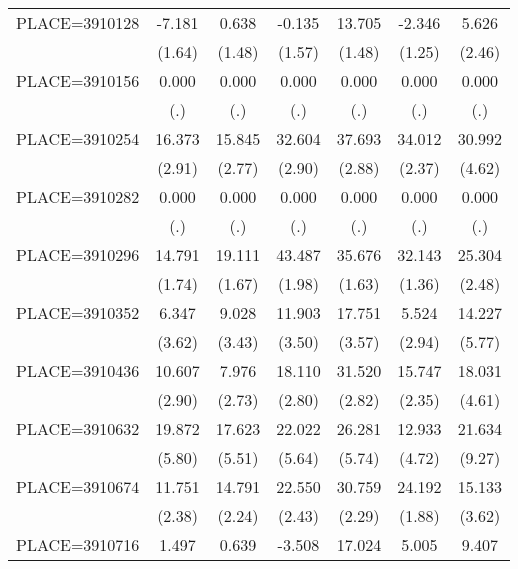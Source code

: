 {\begin{tabular}{l*{6}{c}}
PLACE=3910128       &      -7.181&       0.638&      -0.135&      13.705&      -2.346&       5.626\\
                    &      (1.64)&      (1.48)&      (1.57)&      (1.48)&      (1.25)&      (2.46)\\
PLACE=3910156       &       0.000&       0.000&       0.000&       0.000&       0.000&       0.000\\
                    &         (.)&         (.)&         (.)&         (.)&         (.)&         (.)\\
PLACE=3910254       &      16.373&      15.845&      32.604&      37.693&      34.012&      30.992\\
                    &      (2.91)&      (2.77)&      (2.90)&      (2.88)&      (2.37)&      (4.62)\\
PLACE=3910282       &       0.000&       0.000&       0.000&       0.000&       0.000&       0.000\\
                    &         (.)&         (.)&         (.)&         (.)&         (.)&         (.)\\
PLACE=3910296       &      14.791&      19.111&      43.487&      35.676&      32.143&      25.304\\
                    &      (1.74)&      (1.67)&      (1.98)&      (1.63)&      (1.36)&      (2.48)\\
PLACE=3910352       &       6.347&       9.028&      11.903&      17.751&       5.524&      14.227\\
                    &      (3.62)&      (3.43)&      (3.50)&      (3.57)&      (2.94)&      (5.77)\\
PLACE=3910436       &      10.607&       7.976&      18.110&      31.520&      15.747&      18.031\\
                    &      (2.90)&      (2.73)&      (2.80)&      (2.82)&      (2.35)&      (4.61)\\
PLACE=3910632       &      19.872&      17.623&      22.022&      26.281&      12.933&      21.634\\
                    &      (5.80)&      (5.51)&      (5.64)&      (5.74)&      (4.72)&      (9.27)\\
PLACE=3910674       &      11.751&      14.791&      22.550&      30.759&      24.192&      15.133\\
                    &      (2.38)&      (2.24)&      (2.43)&      (2.29)&      (1.88)&      (3.62)\\
PLACE=3910716       &       1.497&       0.639&      -3.508&      17.024&       5.005&       9.407\\

\end{tabular}}

